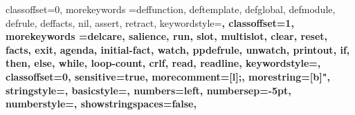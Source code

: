 \usepackage{listings}
\usepackage{xcolor}


%

{
  classoffset=0,
  morekeywords ={deffunction, deftemplate, defglobal, defmodule, defrule, deffacts, nil, assert, retract},
  keywordstyle=\bfseries\color{solarized-orange},
  classoffset=1,
  morekeywords ={delcare, salience, run, slot, multislot, clear, reset, facts, exit, agenda, initial-fact, watch, ppdefrule, unwatch, printout, if, then, else, while, loop-count, crlf, read, readline},
  keywordstyle=\bfseries,
  classoffset=0,
  sensitive=true,
  morecomment=[l]{;},
  morestring=[b]{"},
  stringstyle=\color{solarized-grey},
  basicstyle=\scriptsize,%
  numbers=left,
  numbersep=-5pt,
  numberstyle=\tiny,
  showstringspaces=false,
  }

\renewcommand{\ttdefault}{pcr}

\def\truncdiv#1#2{((#1-(#2-1)/2)/#2)}
\def\moduloop#1#2{(#1-\truncdiv{#1}{#2}*#2)}
\def\modulo#1#2{\number\numexpr\moduloop{#1}{#2}\relax}    

\makeatletter

\newcount\netParensCount@clisp

\lst@CCPutMacro
{}%
%
\@empty\z@\@empty
\newcommand\rainbow@clisp[1]{%
  \ifcase\modulo\netParensCount@clisp 5\relax%
  \textcolor{solarized-cyan}{\bfseries#1}%
  \or
  \textcolor{solarized-yellow}{\bfseries#1}%
  \or
  \textcolor{solarized-magenta}{\bfseries#1}%
  \or
  \textcolor{solarized-violet}{\bfseries#1}%
  \else
  \textcolor{solarized-red}{\bfseries#1}%
  \fi
}

